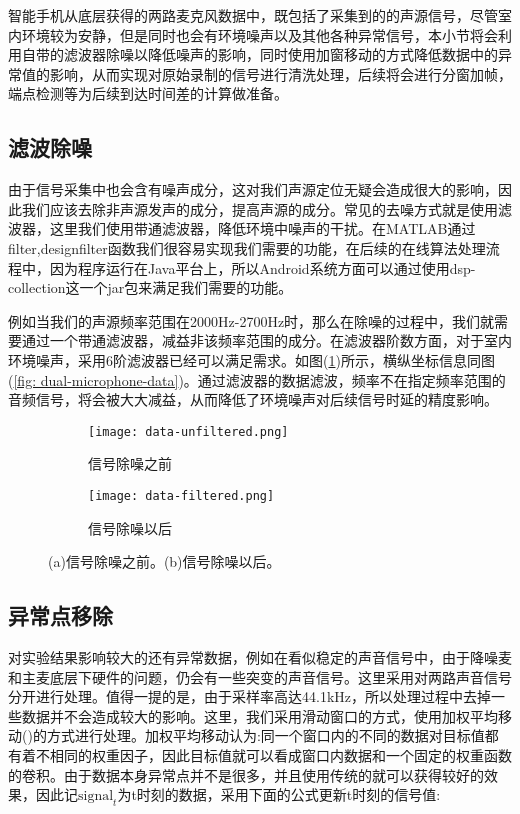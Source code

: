 \documentclass[winfonts,oneside]{njuthesis}
\begin{document}
		智能手机从底层获得的两路麦克风数据中，既包括了采集到的的声源信号，尽管室内环境较为安静，但是同时也会有环境噪声以及其他各种异常信号，本小节将会利用自带的滤波器除噪以降低噪声的影响，同时使用加窗移动的方式降低数据中的异常值的影响，从而实现对原始录制的信号进行清洗处理，后续将会进行分窗加帧，端点检测等为后续到达时间差的计算做准备。

		\subsection{滤波除噪}
			
			由于信号采集中也会含有噪声成分，这对我们声源定位无疑会造成很大的影响，因此我们应该去除非声源发声的成分，提高声源的成分。常见的去噪方式就是使用滤波器，这里我们使用带通滤波器，降低环境中噪声的干扰。在MATLAB通过filter,designfilter函数我们很容易实现我们需要的功能，在后续的在线算法处理流程中，因为程序运行在Java平台上，所以Android系统方面可以通过使用dsp-collection这一个jar包来满足我们需要的功能。
			
			例如当我们的声源频率范围在2000Hz-2700Hz时，那么在除噪的过程中，我们就需要通过一个带通滤波器，减益非该频率范围的成分。在滤波器阶数方面，对于室内环境噪声，采用6阶滤波器已经可以满足需求。如图(\ref{fig: filter-data})所示，横纵坐标信息同图(\ref{fig: dual-microphone-data})。通过滤波器的数据滤波，频率不在指定频率范围的音频信号，将会被大大减益，从而降低了环境噪声对后续信号时延的精度影响。
			
			\begin{figure}[H]
				\centering
				\begin{subfigure}{\textwidth}
					\centering
					\texttt{[image: data-unfiltered.png]}
					\caption{信号除噪之前}
				\end{subfigure}
				\begin{subfigure}{\textwidth}
					\centering
					\texttt{[image: data-filtered.png]}
					\caption{信号除噪以后}
				\end{subfigure}
				\caption{(a)信号除噪之前。(b)信号除噪以后。}
				\label{fig: filter-data}
			\end{figure}
					
		\subsection{异常点移除}
		
			对实验结果影响较大的还有异常数据，例如在看似稳定的声音信号中，由于降噪麦和主麦底层下硬件的问题，仍会有一些突变的声音信号。这里采用对两路声音信号分开进行处理。值得一提的是，由于采样率高达44.1kHz，所以处理过程中去掉一些数据并不会造成较大的影响。这里，我们采用滑动窗口的方式，使用加权平均移动(\cite{Moving_average})的方式进行处理。加权平均移动认为:同一个窗口内的不同的数据对目标值都有着不相同的权重因子，因此目标值就可以看成窗口内数据和一个固定的权重函数的卷积。由于数据本身异常点并不是很多，并且使用传统的就可以获得较好的效果，因此记$\text{signal}_t$为t时刻的数据，采用下面的公式更新t时刻的信号值:
			
\end{document}

